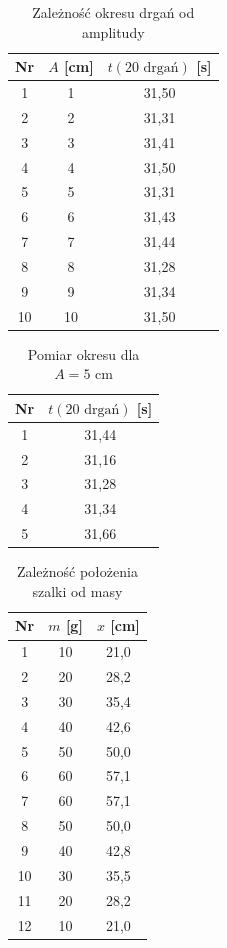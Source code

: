 \documentclass[a4paper,12pt]{article}
\begin{document}
\begin{table}[H]
    \centering
    \begin{tabular}{|c|c|c|}
        \hline
        Nr & $A$ [cm] & $t(20 \text{ drgań})$ [s] \\
        \hline
        1  & 1 & 31,50 \\
        2  & 2 & 31,31 \\
        3  & 3 & 31,41 \\
        4  & 4 & 31,50 \\
        5  & 5 & 31,31 \\
        6  & 6 & 31,43 \\
        7  & 7 & 31,44 \\
        8  & 8 & 31,28 \\
        9  & 9 & 31,34 \\
        10 & 10 & 31,50 \\
        \hline
    \end{tabular}
    \caption{Zależność okresu drgań od amplitudy}
\end{table}

\begin{table}[H]
    \centering
    \begin{tabular}{|c|c|}
        \hline
        Nr & $t(20 \text{ drgań})$ [s] \\
        \hline
        1 & 31,44 \\
        2 & 31,16 \\
        3 & 31,28 \\
        4 & 31,34 \\
        5 & 31,66 \\
        \hline
    \end{tabular}
    \caption{Pomiar okresu dla $A = 5 \text{ cm}$}
    \label{tab:okres_5cm}
\end{table}

\begin{table}[H]
    \centering
    \begin{tabular}{|c|c|c|}
        \hline
        Nr & $m$ [g] & $x$ [cm] \\
        \hline
        1  & 10  & 21,0 \\
        2  & 20  & 28,2 \\
        3  & 30  & 35,4 \\
        4  & 40  & 42,6 \\
        5  & 50  & 50,0 \\
        6  & 60  & 57,1 \\
        \hline
        7  & 60  & 57,1 \\
        8  & 50  & 50,0 \\
        9  & 40  & 42,8 \\
        10 & 30  & 35,5 \\
        11 & 20  & 28,2 \\
        12 & 10  & 21,0 \\
        \hline
    \end{tabular}
    \caption{Zależność położenia szalki od masy}
\end{table}
\end{document}
